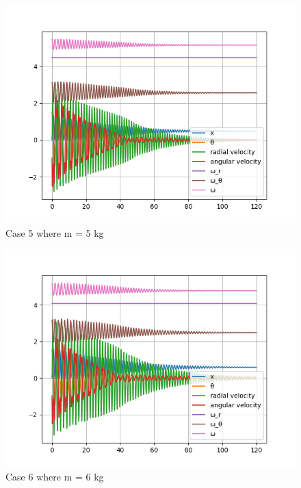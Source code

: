 \begin{figure}[H]
    \centering
    \includegraphics[width=15cm]{ExpPictures/m5.png}
    \caption{{Case 5 where m = 5 kg}}
    \label{}
\end{figure}
        
\begin{figure}[H]
    \centering
    \includegraphics[width=15cm]{ExpPictures/m6.png}
    \caption{{Case 6 where m = 6 kg}}
    \label{}
\end{figure}
        
